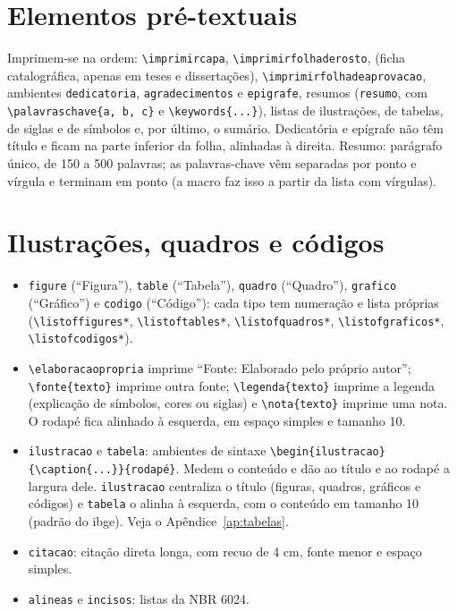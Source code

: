 \section{Elementos pré-textuais}

Imprimem-se na ordem: \texttt{\textbackslash imprimircapa}, \texttt{\textbackslash imprimirfolhaderosto},
(ficha catalográfica, apenas em teses e dissertações),
\texttt{\textbackslash imprimirfolhadeaprovacao}, ambientes \texttt{dedicatoria},
\texttt{agradecimentos} e \texttt{epigrafe}, resumos (\texttt{resumo}, com
\texttt{\textbackslash palavraschave\{a, b, c\}} e \texttt{\textbackslash keywords\{...\}}),
listas de ilustrações, de tabelas, de siglas e de símbolos e, por último, o sumário.
Dedicatória e epígrafe não têm título e ficam na parte inferior da folha, alinhadas à
direita. Resumo: parágrafo único, de 150 a 500 palavras; as palavras-chave vêm separadas
por ponto e vírgula e terminam em ponto (a macro faz isso a partir da lista com vírgulas).

\section{Ilustrações, quadros e códigos}

\begin{itemize}
  \item \texttt{figure} (``Figura''), \texttt{table} (``Tabela''), \texttt{quadro}
        (``Quadro''), \texttt{grafico} (``Gráfico'') e \texttt{codigo} (``Código''):
        cada tipo tem numeração e lista próprias
        (\texttt{\textbackslash listoffigures*}, \texttt{\textbackslash listoftables*},
        \texttt{\textbackslash listofquadros*}, \texttt{\textbackslash listofgraficos*},
        \texttt{\textbackslash listofcodigos*}).
  \item \texttt{\textbackslash elaboracaopropria} imprime ``Fonte: Elaborado pelo próprio autor'';
        \texttt{\textbackslash fonte\{texto\}} imprime outra fonte; \texttt{\textbackslash legenda\{texto\}}
        imprime a legenda (explicação de símbolos, cores ou siglas) e \texttt{\textbackslash nota\{texto\}}
        imprime uma nota. O rodapé fica alinhado à esquerda, em espaço simples e tamanho 10.
  \item \texttt{ilustracao} e \texttt{tabela}: ambientes de sintaxe
        \texttt{\textbackslash begin\{ilustracao\}\allowbreak\{\textbackslash caption\{...\}\}\allowbreak\{rodapé\}}.
        Medem o conteúdo e dão ao título e ao rodapé a largura dele. \texttt{ilustracao}
        centraliza o título (figuras, quadros, gráficos e códigos) e \texttt{tabela} o
        alinha à esquerda, com o conteúdo em tamanho 10 (padrão do \ac{ibge}). Veja o
        Apêndice~\ref{ap:tabelas}.
  \item \texttt{citacao}: citação direta longa, com recuo de 4 cm, fonte menor e espaço simples.
  \item \texttt{alineas} e \texttt{incisos}: listas da NBR 6024.
\end{itemize}


